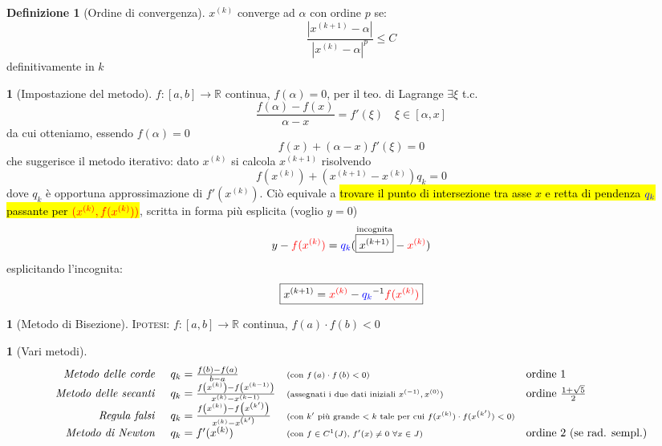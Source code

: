 \documentclass[a4paper,10pt]{article}
\theoremstyle{definition}
\newcommand{\noun}[1]{\textsc{#1}}
\theoremstyle{indentdefinition}
\newtheorem{defn}{Definizione}[section]
\theoremstyle{indenttheorem}
\theoremstyle{myremark}
\theoremstyle{indentgeneral}
\newtheorem{lyxalgorithm}[thm]{\protect\algorithmname}
\theoremstyle{plain}
\theoremstyle{plain}
\begin{document}
\begin{defn}[Ordine di convergenza]
$x^{\left(k\right)}$ converge ad $\alpha$ con ordine $p$ se: $$\frac{\left|x^{\left(k+1\right)}-\alpha\right|}{\left|x^{\left(k\right)}-\alpha\right|^{p}}\leq C$$
definitivamente in $k$
\end{defn}

\begin{lyxalgorithm}[Impostazione del metodo]
$f\colon\left[a,b\right]\rightarrow\mathbb{R}$ continua, $f(\alpha)=0$, per il teo. di Lagrange $\exists\xi$ t.c.
$$\frac{f(\alpha)-f(x)}{\alpha-x}=f'(\xi)\quad \xi\in[\alpha, x]$$
da cui otteniamo, essendo $f(\alpha)=0$
$$f(x)+(\alpha-x)f'(\xi)=0$$
che suggerisce il metodo iterativo: dato $x^{(k)}$ si calcola $x^{(k+1)}$ risolvendo
$$f(x^{(k)})+(x^{(k+1)}-x^{(k)})q_k=0$$
dove $q_k$ è opportuna approssimazione di $f'(x^{(k)})$. Ciò equivale a \hl{trovare il punto di intersezione tra asse $x$ e retta di pendenza $\textcolor{blue}{q_k}$  passante per $\textcolor{red}{(x^{(k)},f(x^{(k)}))}$},  scritta in forma più esplicita (voglio $y=0$)
$$y-\textcolor{red}{f(x^{(k)})}=\textcolor{blue}{q_k}(\overset{\text{incognita}}{\boxed{x^{(k+1)}}}-\textcolor{red}{x^{(k)}})$$
esplicitando l'incognita:
$$\boxed{x^{(k+1)}=\textcolor{red}{x^{(k)}}-\textcolor{blue}{q_k}^{-1}\textcolor{red}{f(x^{(k)})}}$$
\end{lyxalgorithm}

\begin{lyxalgorithm}[Metodo di Bisezione]
\noun{Ipotesi:} $f\colon\left[a,b\right]\rightarrow\mathbb{R}$ continua,
$f\left(a\right)\cdot f\left(b\right)<0$
\end{lyxalgorithm}

\begin{lyxalgorithm}[Vari metodi]
\[
\begin{array}{rlll}
\text{\emph{Metodo delle corde }} & q_{k}=\frac{f\left(b\right)-f\left(a\right)}{b-a} & {\scriptstyle \text{(con \ensuremath{f\left(a\right)\cdot f\left(b\right)<0})}}  & \text{ordine 1}\\
\text{\emph{Metodo delle secanti }} & q_{k}=\frac{f\left(x^{\left(k\right)}\right)-f\left(x^{\left(k-1\right)}\right)}{x^{\left(k\right)}-x^{\left(k-1\right)}}& {\scriptstyle \text{(assegnati i due dati iniziali $x^{(-1)},x^{(0)}$)}}  & \text{ordine $\frac{1+\sqrt{5}}{2}$}\\
\text{\emph{Regula falsi }} & q_{k}=\frac{f\left(x^{\left(k\right)}\right)-f\left(x^{\left(k'\right)}\right)}{x^{\left(k\right)}-x^{\left(k'\right)}} & {\scriptstyle \text{(con \ensuremath{k'} più grande \ensuremath{<k} tale per cui \ensuremath{f(x^{\left(k\right)})\cdot f(x^{\left(k'\right)})<0})}} & \\
\text{\emph{Metodo di Newton }} & q_{k}=f'(x^{(k)}) & {\scriptstyle \text{(con $f\in  C^1(J)$, $f'(x)\ne 0$ $\forall x\in J$)}}  & \text{ordine 2 (se rad. sempl.)}
\end{array}
\]
\end{lyxalgorithm}
\end{document}
